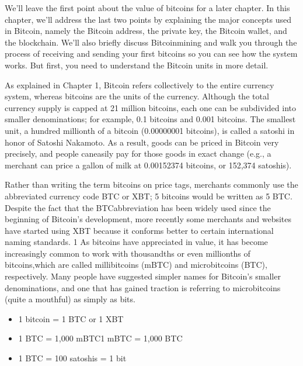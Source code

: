 \par We’ll leave the first point about the value of bitcoins for a later chapter. In this chapter, we’ll address the last two points by explaining the major concepts used in Bitcoin, namely the Bitcoin address, the private key, the Bitcoin wallet, and the blockchain. We’ll also briefly discuss Bitcoinmining and walk you through the process of receiving and sending your first bitcoins so you can see how the system works. But first, you need to understand the Bitcoin units in more detail.


\par As explained in Chapter 1, Bitcoin refers collectively to the entire currency system, whereas bitcoins are the units of the currency. Although the total currency supply is capped at 21 million bitcoins, each one can be subdivided into smaller denominations; for example, 0.1 bitcoins and 0.001 bitcoins. The smallest unit, a hundred millionth of a bitcoin (0.00000001 bitcoins), is called a satoshi in honor of Satoshi Nakamoto. As a result, goods can be priced in Bitcoin very precisely, and people caneasily pay for those goods in exact change (e.g., a merchant can price a gallon of milk at 0.00152374 bitcoins, or 152,374 satoshis).

\par Rather than writing the term bitcoins on price tags, merchants commonly use the abbreviated currency code BTC or XBT; 5 bitcoins would be written as 5 BTC. Despite the fact that the BTCabbreviation has been widely used since the beginning of Bitcoin’s development, more recently some merchants and websites have started using XBT because it conforms better to certain international naming standards. 1 As bitcoins have appreciated in value, it has become increasingly common to work with thousandths or even millionths of bitcoins,which are called millibitcoins (mBTC) and microbitcoins (\micro BTC), respectively. Many people have suggested simpler names for Bitcoin’s smaller denominations, and one that has gained traction is referring to microbitcoins (quite a mouthful) as simply as bits.

\begin{itemize}
  \item 1 bitcoin = 1 BTC or 1 XBT
  \item 1 BTC = 1,000 mBTC1 mBTC = 1,000 \micro BTC
  \item 1 \micro BTC = 100 satoshis = 1 bit
\end{itemize}

